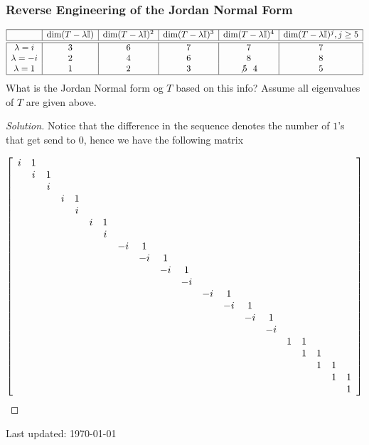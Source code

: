 \subsubsection*{Reverse Engineering of the Jordan Normal Form}
\[ \begin{array}{|c|c|c|c|c|c|}
\hline 
& \dim (T - \lambda \mathbb I) & \dim (T - \lambda \mathbb I)^2 & \dim (T - \lambda \mathbb I)^3 & \dim (T - \lambda \mathbb I)^4 & \dim (T - \lambda \mathbb I)^j, j \geq 5 \\
\hline
\hline 
\lambda = i & 3 & 6 & 7 & 7 & 7 \\
\lambda = -i & 2 & 4 & 6 & 8 & 8 \\
\lambda = 1 & 1 & 2 & 3 & \not5 \ \ 4 & 5 \\
\hline
\end{array}\]
What is the Jordan Normal form og $T$ based on this info? Assume all eigenvalues of $T$ are given above.
\begin{proof}[Solution] Notice that the difference in the sequence denotes the number of $1$'s that get send to $0$, hence we have the following matrix

\[ \left[ \begin{array}{ccccccccccccccccccccccccccccccccccccccccccccccccccccccccccc} 
	i & 1\\
	& i & 1\\
	&& i \\
	&&& i & 1\\
	&&&& i \\
	&&&&& i & 1\\
	&&&&&& i \\
	&&&&&&& -i & 1 \\
	&&&&&&&& -i & 1 \\
	&&&&&&&&& -i & 1 \\
	&&&&&&&&&& -i  \\
	&&&&&&&&&&& -i & 1 \\
	&&&&&&&&&&&& -i & 1 \\
	&&&&&&&&&&&&& -i & 1\\
	&&&&&&&&&&&&&& -i \\
	&&&&&&&&&&&&&&& 1 & 1 \\
	&&&&&&&&&&&&&&&& 1 & 1 \\
	&&&&&&&&&&&&&&&&& 1 & 1 \\
	&&&&&&&&&&&&&&&&&& 1 & 1 \\
	&&&&&&&&&&&&&&&&&&& 1 \end{array} \right]\]
\end{proof}
 \vfill
\begin{center} 
    Last updated: \today
\end{center}


